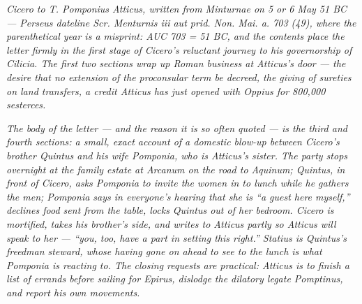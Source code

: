
\textit{Cicero to T. Pomponius Atticus, written from Minturnae
on 5 or 6 May 51 BC --- Perseus dateline \textit{Scr. Menturnis
iii aut prid. Non. Mai. a. 703 (49)}, where the parenthetical
year is a misprint: AUC 703 = 51 BC, and the contents place the
letter firmly in the first stage of Cicero's reluctant journey
to his governorship of Cilicia. The first two sections wrap up
Roman business at Atticus's door --- the desire that no
extension of the proconsular term be decreed, the giving of
sureties on land transfers, a credit Atticus has just opened
with Oppius for 800{,}000 sesterces.}

\textit{The body of the letter --- and the reason it is so often
quoted --- is the third and fourth sections: a small, exact
account of a domestic blow-up between Cicero's brother Quintus
and his wife Pomponia, who is Atticus's sister. The party stops
overnight at the family estate at Arcanum on the road to
Aquinum; Quintus, in front of Cicero, asks Pomponia to invite
the women in to lunch while he gathers the men; Pomponia says
in everyone's hearing that she is ``a guest here myself,''
declines food sent from the table, locks Quintus out of her
bedroom. Cicero is mortified, takes his brother's side, and
writes to Atticus partly so Atticus will speak to her ---
``you, too, have a part in setting this right.'' Statius is
Quintus's freedman steward, whose having gone on ahead to see to
the lunch is what Pomponia is reacting to. The closing requests
are practical: Atticus is to finish a list of errands before
sailing for Epirus, dislodge the dilatory legate Pomptinus, and
report his own movements.}
